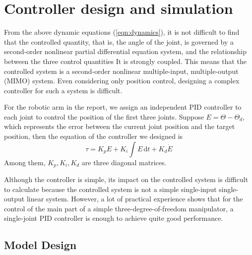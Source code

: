 \documentclass{article}
\begin{document}
\section{Controller design and simulation}

From the above dynamic equations (\autoref{eqn:dynamics}), it is not difficult to find that the controlled quantity, that is, the angle of the joint, is governed by a second-order nonlinear partial differential equation system, and the relationship between the three control quantities It is strongly coupled.
This means that the controlled system is a second-order nonlinear multiple-input, multiple-output (MIMO) system.
Even considering only position control, designing a complex controller for such a system is difficult.

For the robotic arm in the report, we assign an independent PID controller to each joint to control the position of the first three joints.
Suppose $E = \Theta - \Theta_d$, which represents the error between the current joint position and the target position, then the equation of the controller we designed is
\[
\tau = K_p E + K_i \int E \, \mathrm d t + K_d \dot E
\]
Among them, $K_p, K_i, K_d$ are three diagonal matrices.


Although the controller is simple, its impact on the controlled system is difficult to calculate because the controlled system is not a simple single-input single-output linear system.
However, a lot of practical experience shows that for the control of the main part of a simple three-degree-of-freedom manipulator, a single-joint PID controller is enough to achieve quite good performance.

\subsection{Model Design}
\end{document}
